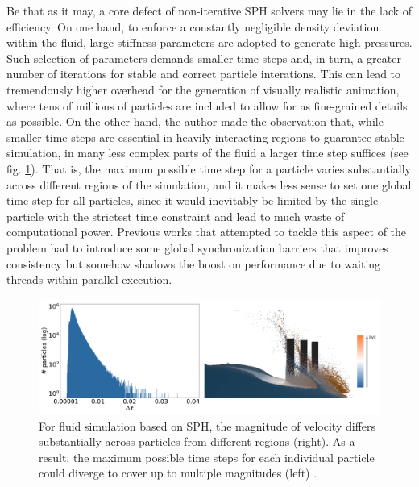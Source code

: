 \documentclass[
	11pt, 
	DIV10,
	ngerman,
	a4paper, 
	oneside, 
	headings=normal, 
	captions=tableheading,
	final, 
	numbers=noenddot
]{scrartcl}
\begin{document}
\par
Be that as it may, a core defect of non-iterative SPH solvers may lie in the lack of efficiency. On one hand, to enforce a constantly negligible density deviation within the fluid, large stiffness parameters are adopted to generate high pressures. Such selection of parameters demands smaller time steps and, in turn, a greater number of iterations for stable and correct particle interations. This can lead to tremendously higher overhead for the generation of visually realistic animation, where tens of millions of particles are included to allow for as fine-grained details as possible. On the other hand, the author made the observation that, while smaller time steps are essential in heavily interacting regions to guarantee stable simulation, in many less complex parts of the fluid a larger time step suffices (see fig. \ref{fig2}). That is, the maximum possible time step for a particle varies substantially across different regions of the simulation, and it makes less sense to set one global time step for all particles, since it would inevitably be limited by the single particle with the strictest time constraint and lead to much waste of computational power. Previous works that attempted to tackle this aspect of the problem had to introduce some global synchronization barriers that improves consistency but somehow shadows the boost on performance due to waiting threads within parallel execution.

\begin{figure}[tb]
	\centering
	\includegraphics[scale=0.3]{images/1}
	\caption{\label{fig2} For fluid simulation based on SPH, the magnitude of velocity differs substantially across particles from different regions (right). As a result, the maximum possible time steps for each individual particle could diverge to cover up to multiple magnitudes (left) \cite{reinhardt2017fully}.}
\end{figure}
\end{document}
